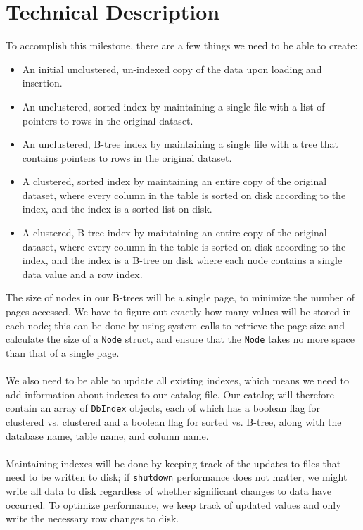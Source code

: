 \documentclass[12pt]{article}
\newcommand{\code}{\texttt}
\begin{document}
\section{Technical Description}
To accomplish this milestone, there are a few things we need to be able to create:
\begin{itemize}
\setlength\itemsep{0cm}
\item An initial unclustered, un-indexed copy of the data upon loading and insertion.
\item An unclustered, sorted index by maintaining a single file with a list of pointers to rows in the original dataset.
\item An unclustered, B-tree index by maintaining a single file with a tree that contains pointers to rows in the original dataset.
\item A clustered, sorted index by maintaining an entire copy of the original dataset, where every column in the table is sorted on disk according to the index, and the index is a sorted list on disk.
\item A clustered, B-tree index by maintaining an entire copy of the original dataset, where every column in the table is sorted on disk according to the index, and the index is a B-tree on disk where each node contains a single data value and a row index.
\end{itemize}
The size of nodes in our B-trees will be a single page, to minimize the number of pages accessed.  We have to figure out exactly how many values will be stored in each node; this can be done by using system calls to retrieve the page size and calculate the size of a \code{Node} struct, and ensure that the \code{Node} takes no more space than that of a single page.
\\\\We also need to be able to update all existing indexes, which means we need to add information about indexes to our catalog file.  Our catalog will therefore contain an array of \code{DbIndex} objects, each of which has a boolean flag for clustered vs. clustered and a boolean flag for sorted vs. B-tree, along with the database name, table name, and column name.
\\\\Maintaining indexes will be done by keeping track of the updates to files that need to be written to disk; if \code{shutdown} performance does not matter, we might write all data to disk regardless of whether significant changes to data have occurred.  To optimize performance, we keep track of updated values and only write the necessary row changes to disk.
\end{document}

